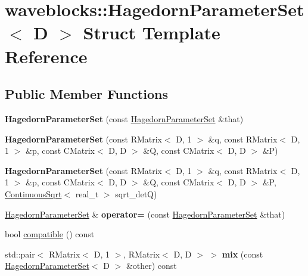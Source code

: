 \hypertarget{structwaveblocks_1_1_hagedorn_parameter_set}{}\section{waveblocks\+:\+:Hagedorn\+Parameter\+Set$<$ D $>$ Struct Template Reference}
\label{structwaveblocks_1_1_hagedorn_parameter_set}
\subsection*{Public Member Functions}
\begin{DoxyCompactItemize}
\item 
\hypertarget{structwaveblocks_1_1_hagedorn_parameter_set_a6a4093ecc987d07ef1280770cba17ef5}{}{\bfseries Hagedorn\+Parameter\+Set} (const \hyperlink{structwaveblocks_1_1_hagedorn_parameter_set}{Hagedorn\+Parameter\+Set} \&that)\label{structwaveblocks_1_1_hagedorn_parameter_set_a6a4093ecc987d07ef1280770cba17ef5}

\item 
\hypertarget{structwaveblocks_1_1_hagedorn_parameter_set_a942784fab6a0514a8adb9ca474e0180a}{}{\bfseries Hagedorn\+Parameter\+Set} (const R\+Matrix$<$ D, 1 $>$ \&q, const R\+Matrix$<$ D, 1 $>$ \&p, const C\+Matrix$<$ D, D $>$ \&Q, const C\+Matrix$<$ D, D $>$ \&P)\label{structwaveblocks_1_1_hagedorn_parameter_set_a942784fab6a0514a8adb9ca474e0180a}

\item 
\hypertarget{structwaveblocks_1_1_hagedorn_parameter_set_a72196745e44d089170f0dfd3c039a695}{}{\bfseries Hagedorn\+Parameter\+Set} (const R\+Matrix$<$ D, 1 $>$ \&q, const R\+Matrix$<$ D, 1 $>$ \&p, const C\+Matrix$<$ D, D $>$ \&Q, const C\+Matrix$<$ D, D $>$ \&P, \hyperlink{classwaveblocks_1_1_continuous_sqrt}{Continuous\+Sqrt}$<$ real\+\_\+t $>$ sqrt\+\_\+det\+Q)\label{structwaveblocks_1_1_hagedorn_parameter_set_a72196745e44d089170f0dfd3c039a695}

\item 
\hypertarget{structwaveblocks_1_1_hagedorn_parameter_set_a5aced398bf12f24d1ed1a8000ec0c46e}{}\hyperlink{structwaveblocks_1_1_hagedorn_parameter_set}{Hagedorn\+Parameter\+Set} \& {\bfseries operator=} (const \hyperlink{structwaveblocks_1_1_hagedorn_parameter_set}{Hagedorn\+Parameter\+Set} \&that)\label{structwaveblocks_1_1_hagedorn_parameter_set_a5aced398bf12f24d1ed1a8000ec0c46e}

\item 
bool \hyperlink{structwaveblocks_1_1_hagedorn_parameter_set_a5fe480ec9fc245780d9b27a04c89444c}{compatible} () const 
\item 
\hypertarget{structwaveblocks_1_1_hagedorn_parameter_set_a38983ea6b7b773077c2dff06cab377ca}{}std\+::pair$<$ R\+Matrix$<$ D, 1 $>$, R\+Matrix$<$ D, D $>$ $>$ {\bfseries mix} (const \hyperlink{structwaveblocks_1_1_hagedorn_parameter_set}{Hagedorn\+Parameter\+Set}$<$ D $>$ \&other) const \label{structwaveblocks_1_1_hagedorn_parameter_set_a38983ea6b7b773077c2dff06cab377ca}

\end{DoxyCompactItemize}

